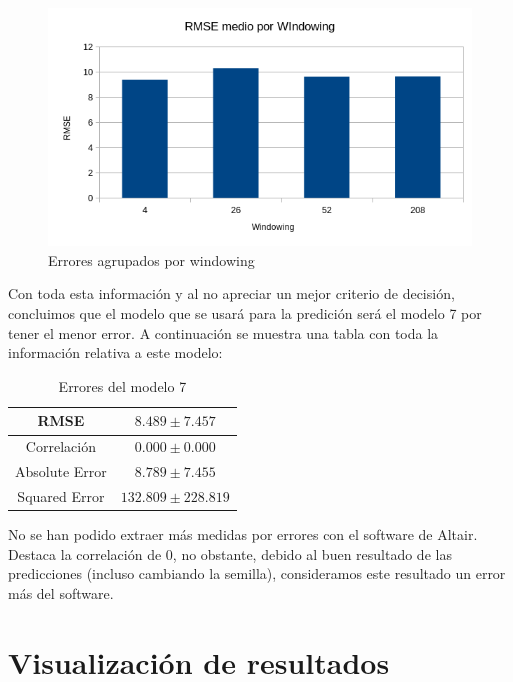 \documentclass[12pt]{report} %
\begin{document}
\begin{figure}[H]
    \includegraphics[width=\linewidth]{RMSE-windowing.png}
    \caption {\small Errores agrupados por windowing}
\end{figure}

Con toda esta información y al no apreciar un mejor criterio de decisión, concluimos que el modelo que se usará para la predición será el modelo 7 por tener el menor error. A continuación se muestra una tabla con toda la información relativa a este modelo:

\begin{table}[H]
\begin{center}
\begin{tabular}{|c|c|}
    \hline
    RMSE                        & $8.489\pm 7.457$\\ 
    \hline
    Correlación                 & $0.000\pm 0.000$\\
    \hline
    Absolute Error              & $8.789\pm7.455$\\
    \hline
    Squared Error               & $132.809\pm 228.819$\\ 
    \hline
\end{tabular}
\caption{Errores del modelo 7}
\end{center}
\end{table}

No se han podido extraer más medidas por errores con el software de Altair. Destaca la correlación de 0, no obstante, debido al buen resultado de las predicciones (incluso cambiando la semilla), consideramos este resultado un error más del software.

\chapter{Visualización de resultados}
\label{chap:result-visualizing}
\end{document}
